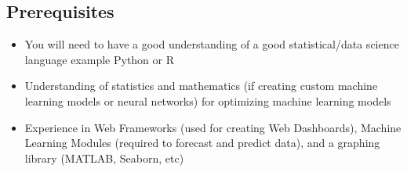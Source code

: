 \subsection{Prerequisites}
\begin{itemize}
    \item You will need to have a good understanding of a good statistical/data science language example Python or R
    \item Understanding of statistics and mathematics (if creating custom machine learning models or neural networks) for optimizing machine learning models
    \item Experience in Web Frameworks (used for creating Web Dashboards), Machine Learning Modules (required to forecast and predict data), and a graphing library (MATLAB, Seaborn, etc)
\end{itemize}